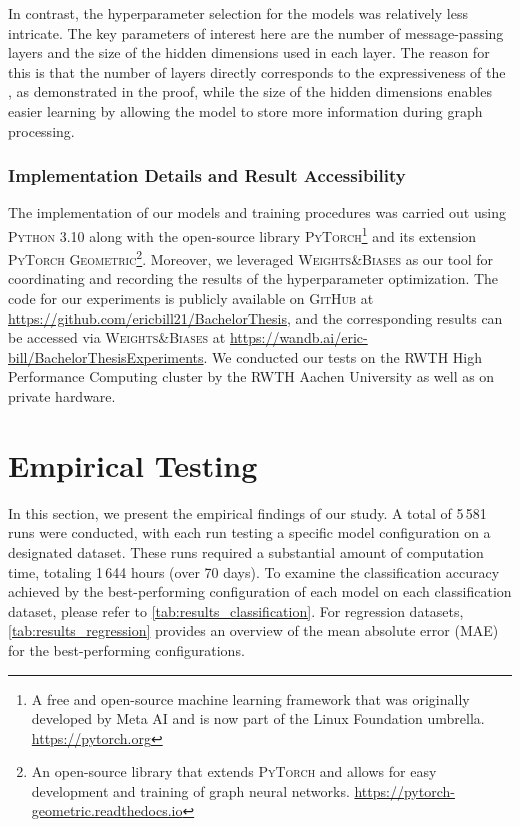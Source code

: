 In contrast, the hyperparameter selection for the \gnn models was relatively less intricate. The key parameters of interest here are the number of message-passing layers and the size of the hidden dimensions used in each layer. The reason for this is that the number of layers directly corresponds to the expressiveness of the \gnn, as demonstrated in the proof, while the size of the hidden dimensions enables easier learning by allowing the model to store more information during graph processing.

\subsubsection{Implementation Details and Result Accessibility}
The implementation of our models and training procedures was carried out using \textsc{Python 3.10} along with the open-source library \textsc{PyTorch}\footnote{A free and open-source machine learning framework that was originally developed by Meta AI and is now part of the Linux Foundation umbrella. \href{https://pytorch.org}{https://pytorch.org}} and its extension \textsc{PyTorch Geometric}\footnote{An open-source library that extends \textsc{PyTorch} and allows for easy development and training of graph neural networks. \href{https://pytorch-geometric.readthedocs.io/en/latest}{https://pytorch-geometric.readthedocs.io}}. Moreover, we leveraged \textsc{Weights\&Biases} as our tool for coordinating and recording the results of the hyperparameter optimization. The code for our experiments is publicly available on \textsc{GitHub} at \url{https://github.com/ericbill21/BachelorThesis}, and the corresponding results can be accessed via \textsc{Weights\&Biases} at \url{https://wandb.ai/eric-bill/BachelorThesisExperiments}. We conducted our tests on the RWTH High Performance Computing cluster by the RWTH Aachen University as well as on private hardware.

\section{Empirical Testing}
In this section, we present the empirical findings of our study. A total of 5\,581 runs were conducted, with each run testing a specific model configuration on a designated dataset. These runs required a substantial amount of computation time, totaling 1\,644 hours (over 70 days). To examine the classification accuracy achieved by the best-performing configuration of each model on each classification dataset, please refer to \cref{tab:results_classification}. For regression datasets, \cref{tab:results_regression} provides an overview of the mean absolute error (MAE) for the best-performing configurations.

